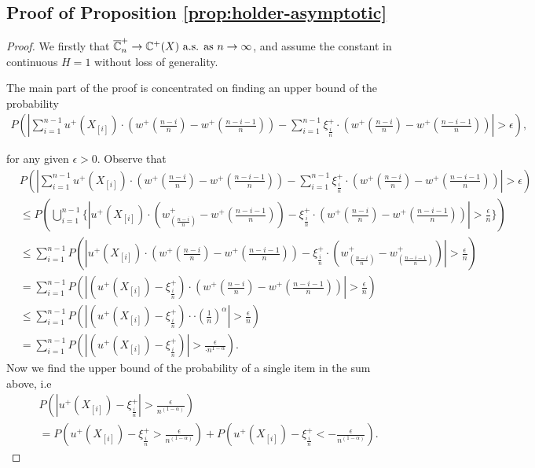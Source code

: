 \subsection*{Proof of Proposition \ref{prop:holder-asymptotic}}

\begin{proof}
We firstly that $\overline {\mathbb{C}}^{+}_n
\rightarrow
\mathbb{C}^{+}(X)
 \text{   a.s. as } n\rightarrow \infty$, and assume the constant in \holder continuous $H=1$ without loss of generality.

The main part of the proof is concentrated on finding an upper bound of the probability
\begin{align}
P ( \left| \sum_{i=1}^{n-1} u^+(X_{[i]}) \cdot (w^+(\frac{n-i}{n} )  - w^+(\frac{n-i-1}{n} ) ) -
\sum_{i=1}^{n-1} \xi^+_{\frac{i}{n}} \cdot (w^+(\frac{n-i}{n} )  - w^+(\frac{n-i-1}{n} ) ) \right| >
\epsilon),
\end{align}

for any given $\epsilon>0$.
Observe that
\begin{align*}
& P ( \left| \sum_{i=1}^{n-1} u^+(X_{[i]}) \cdot (w^+(\frac{n-i}{n} )  - w^+(\frac{n-i-1}{n} ) ) -
\sum_{i=1}^{n-1} \xi^+_{\frac{i}{n}} \cdot (w^+(\frac{n-i}{n} )  - w^+(\frac{n-i-1}{n} ) ) \right| >
\epsilon) \\ & \leq P ( \bigcup _{i=1}^{n-1} \{ \left| u^+(X_{[i]}) \cdot (w^+_(\frac{n-i}{n}) -
w^+{(\frac{n-i-1}{n})}) - \xi^+_{\frac{i}{n}} \cdot (w^+(\frac{n-i}{n} )  - w^+(\frac{n-i-1}{n} ) )
\right| > \frac{\epsilon}{n} \}) \\ & \leq \sum _{i=1}^{n-1} P ( \left| u^+(X_{[i]}) \cdot
(w^+(\frac{n-i}{n} )  - w^+(\frac{n-i-1}{n} ) ) - \xi^+_{\frac{i}{n}} \cdot (w^+_(\frac{n-i}{n}) -
w^+_(\frac{n-i-1}{n})) \right| > \frac{\epsilon}{n}) \\ & = \sum _{i=1}^{n-1} P ( \left| ( u^+(X_{[i]}) -
\xi^+_{\frac{i}{n}}) \cdot (w^+(\frac{n-i}{n} )  - w^+(\frac{n-i-1}{n} ) ) \right| > \frac{\epsilon}{n})
\\ & \leq \sum _{i=1}^{n-1} P ( \left| ( u^+(X_{[i]}) - \xi^+_{\frac{i}{n}}) \cdot \cdot (\frac{1}{n})^{\alpha}
\right| > \frac{\epsilon}{n}) \\ & = \sum _{i=1}^{n-1} P ( \left| ( u^+(X_{[i]}) - \xi^+_{\frac{i}{n}})
\right| > \frac{\epsilon}{\cdot n^{1-\alpha}}).
\end{align*}
Now we find the upper bound of the probability of a single item in the sum above, i.e
\begin{align*}
& P( \left | u^+(X_{[i]}) - \xi^+_{\frac{i}{n}} \right | > \frac {\epsilon} {n^{(1-\alpha)}}) \\ & = P (
    u^+(X_{[i]}) - \xi^+_{\frac{i}{n}} > \frac {\epsilon} {n^{(1-\alpha)}}) + P ( u^+(X_{[i]}) -
    \xi^+_{\frac{i}{n}} < - \frac {\epsilon} {n^{(1-\alpha)}}).
\end{align*} 


\end{proof}
